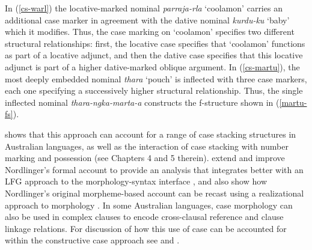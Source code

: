 \documentclass[output=paper,hidelinks]{langscibook}
\begin{document}
In (\ref{cs-warl}) the locative-marked nominal {\it parraja-rla} `coolamon' carries an additional case marker in agreement with the dative nominal {\it kurdu-ku} `baby' which it modifies. Thus, the case marking on `coolamon' specifies two different structural relationships: first, the locative case specifies that `coolamon' functions as part of a locative adjunct, and then the dative case specifies that this locative adjunct is part of a higher dative-marked oblique argument.  In (\ref{cs-martu}), the most deeply embedded nominal {\it thara} `pouch' is inflected with three case markers, each one specifying a successively higher structural relationship. Thus, the single inflected nominal {\it thara-ngka-marta-a} constructs the f-structure shown in (\ref{martu-fs}). 


\citet{nordlinger1998constructive} shows that this approach can account for a range of case stacking structures in Australian languages, as well as the interaction of case stacking with number marking and possession (see Chapters 4 and 5 therein). \citet{sadler-nordlinger2004,SadlNord2006}  extend and improve Nordlinger's formal account to provide an analysis that integrates better with an LFG approach to the morphology-syntax interface \citep{sadler-nordlinger2004}, and also show how Nordlinger's original morpheme-based account can be recast using a realizational approach to morphology \citep{SadlNord2006}. In some Australian languages, case morphology can also be used in complex clauses to encode cross-clausal reference and clause linkage relations. For discussion of how this use of case can be accounted for within the constructive case approach see \citet{nordlinger2000} and \citet{Austin2016}.
\end{document}
